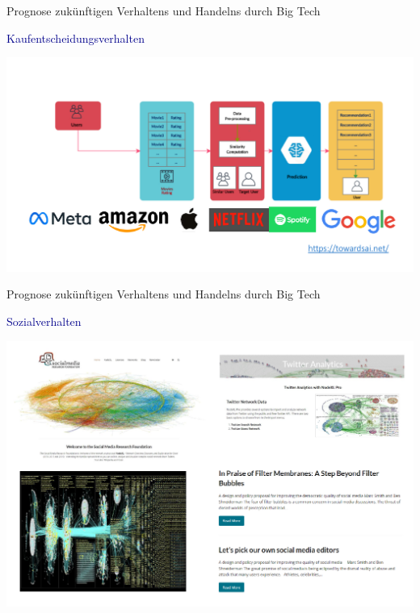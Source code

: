 \documentclass[
  8pt,
  ignorenonframetext,
]{beamer}
\begin{document}
\begin{frame}{Prognose zukünftigen Verhaltens und Handelns durch Big
Tech}
\protect\hypertarget{prognose-zukuxfcnftigen-verhaltens-und-handelns-durch-big-tech-3}{}
\vfill

\textcolor{darkblue}{Kaufentscheidungsverhalten}

\begin{center}\includegraphics[width=1\linewidth]{2_Abbildungen/pfm_2_bigtech_recommender_systems} \end{center}
\vfill
\end{frame}

\begin{frame}{Prognose zukünftigen Verhaltens und Handelns durch Big
Tech}
\protect\hypertarget{prognose-zukuxfcnftigen-verhaltens-und-handelns-durch-big-tech-4}{}
\vfill

\textcolor{darkblue}{Sozialverhalten}

\begin{center}\includegraphics[width=0.9\linewidth]{2_Abbildungen/pfm_2_bigtech_sozialpsychologie} \end{center}
\vfill
\end{frame}
\end{document}
